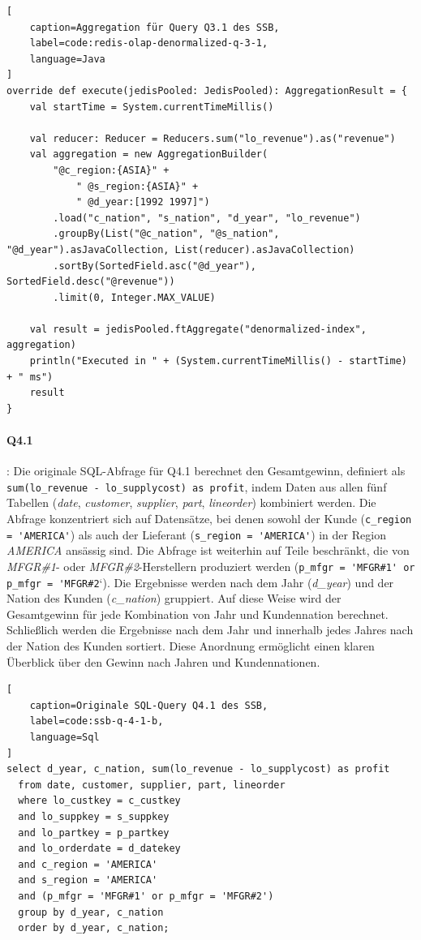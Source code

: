 \begin{lstlisting}[
    caption=Aggregation für Query Q3.1 des SSB,
    label=code:redis-olap-denormalized-q-3-1,
    language=Java
]
override def execute(jedisPooled: JedisPooled): AggregationResult = {
	val startTime = System.currentTimeMillis()

	val reducer: Reducer = Reducers.sum("lo_revenue").as("revenue")
	val aggregation = new AggregationBuilder(
		"@c_region:{ASIA}" +
			" @s_region:{ASIA}" +
			" @d_year:[1992 1997]")
		.load("c_nation", "s_nation", "d_year", "lo_revenue")
		.groupBy(List("@c_nation", "@s_nation", "@d_year").asJavaCollection, List(reducer).asJavaCollection)
		.sortBy(SortedField.asc("@d_year"), SortedField.desc("@revenue"))
		.limit(0, Integer.MAX_VALUE)

	val result = jedisPooled.ftAggregate("denormalized-index", aggregation)
	println("Executed in " + (System.currentTimeMillis() - startTime) + " ms")
	result
}
\end{lstlisting}

\paragraph{Q4.1}: Die originale SQL-Abfrage für Q4.1 berechnet den Gesamtgewinn, definiert als \lstinline|sum(lo_revenue - lo_supplycost) as profit|, indem Daten aus allen fünf Tabellen (\emph{date}, \emph{customer}, \emph{supplier}, \emph{part}, \emph{lineorder}) kombiniert werden.
Die Abfrage konzentriert sich auf Datensätze, bei denen sowohl der Kunde (\lstinline|c_region = 'AMERICA'|) als auch der Lieferant (\lstinline|s_region = 'AMERICA'|) in der Region \emph{AMERICA} ansässig sind. Die Abfrage ist weiterhin auf Teile beschränkt, die von \emph{MFGR\#1}- oder \emph{MFGR\#2}-Herstellern produziert werden (\lstinline|p_mfgr = 'MFGR#1' or p_mfgr = 'MFGR#2|`).
Die Ergebnisse werden nach dem Jahr (\emph{d\_year}) und der Nation des Kunden (\emph{c\_nation}) gruppiert. Auf diese Weise wird der Gesamtgewinn für jede Kombination von Jahr und Kundennation berechnet.
Schließlich werden die Ergebnisse nach dem Jahr und innerhalb jedes Jahres nach der Nation des Kunden sortiert. Diese Anordnung ermöglicht einen klaren Überblick über den Gewinn nach Jahren und Kundennationen.

\begin{lstlisting}[
    caption=Originale SQL-Query Q4.1 des SSB,
    label=code:ssb-q-4-1-b,
    language=Sql
]
select d_year, c_nation, sum(lo_revenue - lo_supplycost) as profit
  from date, customer, supplier, part, lineorder
  where lo_custkey = c_custkey
  and lo_suppkey = s_suppkey
  and lo_partkey = p_partkey
  and lo_orderdate = d_datekey
  and c_region = 'AMERICA'
  and s_region = 'AMERICA'
  and (p_mfgr = 'MFGR#1' or p_mfgr = 'MFGR#2')
  group by d_year, c_nation
  order by d_year, c_nation;
\end{lstlisting}

